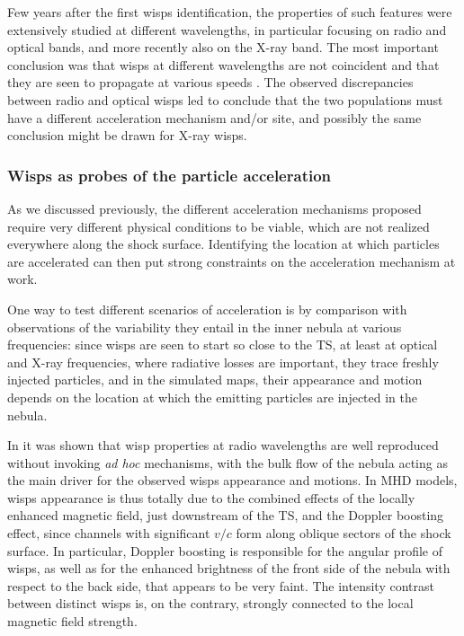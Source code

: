 Few years after the first wisps identification, the properties of such features were extensively studied at different wavelengths, in particular focusing on radio and optical bands, and more recently also on the X-ray band. 
The most important conclusion was that wisps at different wavelengths are not coincident and that they are seen to propagate at various speeds \citep{Bietenholz:2004,Schweizer:2013}.
The observed discrepancies between radio and optical wisps led \citet{Bietenholz:2004} to conclude that the two populations must have a different acceleration mechanism and/or site, and possibly the same conclusion might be drawn for X-ray wisps.


\subsubsection{Wisps as probes of the particle acceleration}

As we discussed previously, the different acceleration mechanisms proposed require very different physical conditions to be viable, which are not realized everywhere along the shock surface. Identifying the location at which particles are accelerated can then put strong constraints on the acceleration mechanism at work.

One way to test different scenarios of acceleration is by comparison with observations of the variability they entail in the inner nebula at various frequencies: since wisps are seen to start so close to the TS, at least at optical and X-ray frequencies, where radiative losses are important, they trace freshly injected particles, and in the simulated maps, their appearance and motion depends on the location at which the emitting particles are injected in the nebula.

In \citet{Olmi:2014} it was shown that wisp properties at radio wavelengths are well reproduced without invoking \emph{ad hoc} mechanisms, with the bulk flow of the nebula acting as the main driver for the observed wisps appearance and motions. 
In MHD models, wisps appearance is thus totally due to the combined effects of the locally enhanced magnetic field, just downstream of the TS, and the Doppler boosting effect, since channels with significant $v/c$ form along oblique sectors of the shock surface.
In particular, Doppler boosting is responsible for the angular profile of wisps, as well as for the enhanced brightness of the front side of the nebula with respect to the back side, that appears to be very faint. 
The intensity contrast between distinct wisps is, on the contrary, strongly connected to the local magnetic field strength.

